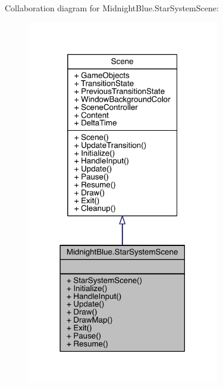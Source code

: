 Collaboration diagram for Midnight\+Blue.\+Star\+System\+Scene\+:
\nopagebreak
\begin{figure}[H]
\begin{center}
\leavevmode
\includegraphics[width=237pt]{class_midnight_blue_1_1_star_system_scene__coll__graph}
\end{center}
\end{figure}
